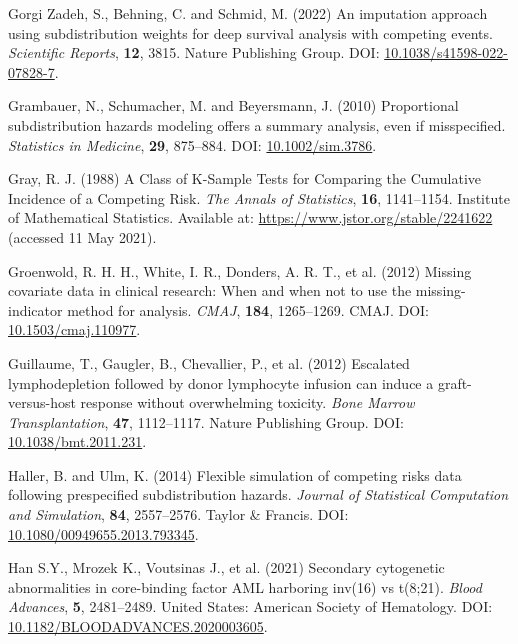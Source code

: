 \documentclass[
  letterpaper,
  DIV=11,
  numbers=noendperiod]{scrreprt}
\newlength{\cslhangindent}
\newlength{\cslentryspacingunit} %
\newenvironment{CSLReferences}[2] %
 {%
  \setlength{\parindent}{0pt}
  \ifodd #1
  \let\oldpar\par
  \def\par{\hangindent=\cslhangindent\oldpar}
  \fi
  \setlength{\parskip}{#2\cslentryspacingunit}
 }%
 {}
\begin{document}
\begin{CSLReferences}{1}{0}
\leavevmode{}%
Gorgi Zadeh, S., Behning, C. and Schmid, M. (2022) An imputation
approach using subdistribution weights for deep survival analysis with
competing events. \emph{Scientific Reports}, \textbf{12}, 3815. Nature
Publishing Group. DOI:
\href{https://doi.org/10.1038/s41598-022-07828-7}{10.1038/s41598-022-07828-7}.

\leavevmode{}%
Grambauer, N., Schumacher, M. and Beyersmann, J. (2010) Proportional
subdistribution hazards modeling offers a summary analysis, even if
misspecified. \emph{Statistics in Medicine}, \textbf{29}, 875--884. DOI:
\href{https://doi.org/10.1002/sim.3786}{10.1002/sim.3786}.

\leavevmode{}%
Gray, R. J. (1988) A {Class} of {K-Sample Tests} for {Comparing} the
{Cumulative Incidence} of a {Competing Risk}. \emph{The Annals of
Statistics}, \textbf{16}, 1141--1154. Institute of Mathematical
Statistics. Available at: \url{https://www.jstor.org/stable/2241622}
(accessed 11 May 2021).

\leavevmode{}%
Groenwold, R. H. H., White, I. R., Donders, A. R. T., et al. (2012)
Missing covariate data in clinical research: When and when not to use
the missing-indicator method for analysis. \emph{CMAJ}, \textbf{184},
1265--1269. CMAJ. DOI:
\href{https://doi.org/10.1503/cmaj.110977}{10.1503/cmaj.110977}.

\leavevmode{}%
Guillaume, T., Gaugler, B., Chevallier, P., et al. (2012) Escalated
lymphodepletion followed by donor lymphocyte infusion can induce a
graft-versus-host response without overwhelming toxicity. \emph{Bone
Marrow Transplantation}, \textbf{47}, 1112--1117. Nature Publishing
Group. DOI:
\href{https://doi.org/10.1038/bmt.2011.231}{10.1038/bmt.2011.231}.

\leavevmode{}%
Haller, B. and Ulm, K. (2014) Flexible simulation of competing risks
data following prespecified subdistribution hazards. \emph{Journal of
Statistical Computation and Simulation}, \textbf{84}, 2557--2576. Taylor
\& Francis. DOI:
\href{https://doi.org/10.1080/00949655.2013.793345}{10.1080/00949655.2013.793345}.

\leavevmode{}%
Han S.Y., Mrozek K., Voutsinas J., et al. (2021) Secondary cytogenetic
abnormalities in core-binding factor {AML} harboring inv(16) vs t(8;21).
\emph{Blood Advances}, \textbf{5}, 2481--2489. United States: American
Society of Hematology. DOI:
\href{https://doi.org/10.1182/BLOODADVANCES.2020003605}{10.1182/BLOODADVANCES.2020003605}.


\end{CSLReferences}
\end{document}
